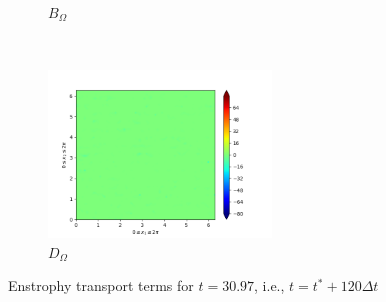 \begin{figure}[H]
\begin{subfigure}{0.45\textwidth}
        \caption{$B_{\Omega}$}
    \end{subfigure}
    ~
    \begin{subfigure}{0.45\textwidth}
        \includegraphics[height=1.75in]{media/run-cds-65/D-enst-1460.png}
        \caption{$D_{\Omega}$}
    \end{subfigure}
    \caption{Enstrophy transport terms for $t=30.97$, i.e., $t=t^{\ast} + 120 \Delta t$}
\end{figure}

\newpage

